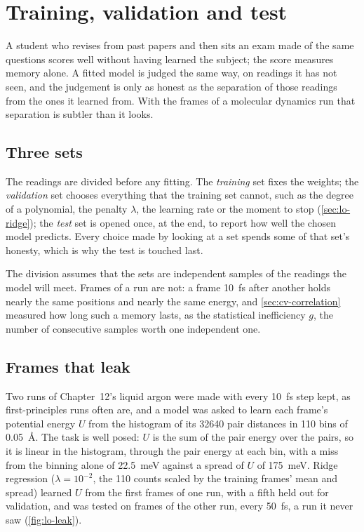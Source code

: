 \section{Training, validation and test}
\label{sec:lo-splits}

A student who revises from past papers and then sits an exam made of the
same questions scores well without having learned the subject; the
score measures memory alone. A fitted model is judged the
same way, on readings it has not seen, and the judgement is only as
honest as the separation of those readings from the ones it learned
from. With the frames of a molecular dynamics run that separation is
subtler than it looks.

\subsection*{Three sets}

The readings are divided before any fitting. The \emph{training} set
fixes the weights; the \emph{validation} set chooses everything that the
training set cannot, such as the degree of a polynomial, the penalty
$\lambda$, the learning rate or the moment to stop
(\cref{sec:lo-ridge}); the \emph{test} set is opened once, at the end, to
report how well the chosen model predicts. Every choice made by looking
at a set spends some of that set's honesty, which is why the test is
touched last.

The division assumes that the sets are independent samples of the
readings the model will meet. Frames of a run are not: a frame
\SI{10}{\femto\second} after another holds nearly the same positions and
nearly the same energy, and \cref{sec:cv-correlation} measured how long
such a memory lasts, as the statistical inefficiency $g$, the number of
consecutive samples worth one independent one.

\subsection*{Frames that leak}

Two runs of Chapter~12's liquid argon were made with every
\SI{10}{\femto\second} step kept, as first-principles runs often are, and
a model was asked to learn each frame's potential energy $U$ from the
histogram of its \num{32640} pair distances in 110 bins of
\SI{0.05}{\angstrom}. The task is well posed: $U$ is the sum of the pair
energy over the pairs, so it is linear in the histogram, through the pair
energy at each bin, with a miss from the binning alone of
\SI{22.5}{\milli\electronvolt} against a spread of $U$ of
\SI{175}{\milli\electronvolt}. Ridge regression ($\lambda = 10^{-2}$, the
110 counts scaled by the training frames' mean and spread) learned $U$
from the first frames of one run, with a fifth held out for validation,
and was tested on frames of the other run, every \SI{50}{\femto\second},
a run it never saw (\cref{fig:lo-leak}).

